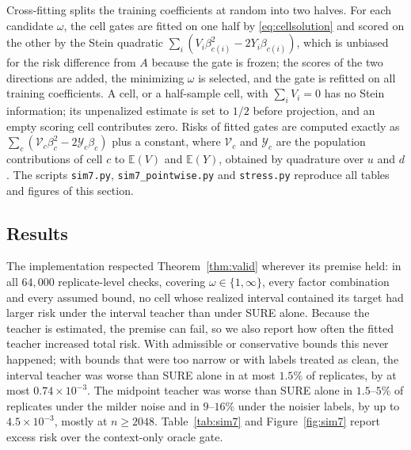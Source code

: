 \documentclass[11pt]{article}
\theoremstyle{plain}
\theoremstyle{definition}
\theoremstyle{remark}
\newcommand{\E}{\mathbb E}
\begin{document}
Cross-fitting splits the training coefficients at random into two halves. For each candidate
$\omega$, the cell gates are fitted on one half by \eqref{eq:cellsolution} and scored on the
other by the Stein quadratic $\sum_i(V_i\beta_{c(i)}^2-2Y_i\beta_{c(i)})$, which is unbiased
for the risk difference from $A$ because the gate is frozen; the scores of the two directions are
added, the minimizing $\omega$ is selected, and the gate is refitted on all training
coefficients. A cell, or a half-sample cell, with $\sum_iV_i=0$ has no Stein information; its
unpenalized estimate is set to $1/2$ before projection, and an empty scoring cell contributes
zero. Risks of fitted gates are computed exactly as $\sum_c(\mathcal V_c\beta_c^2-2\mathcal
Y_c\beta_c)$ plus a constant, where $\mathcal V_c$ and $\mathcal Y_c$ are the population
contributions of cell $c$ to $\E(V)$ and $\E(Y)$, obtained by quadrature over $u$ and $d$. The
scripts \texttt{sim7.py}, \texttt{sim7\_pointwise.py} and \texttt{stress.py} reproduce all tables
and figures of this section.

\subsection{Results}

The implementation respected Theorem~\ref{thm:valid} wherever its premise held: in all
$64{,}000$ replicate-level checks, covering $\omega\in\{1,\infty\}$, every factor combination and
every assumed bound, no cell whose realized interval contained its target had larger risk under
the interval teacher than under SURE alone. Because the teacher is estimated, the premise can
fail, so we also report how often the fitted teacher increased total risk. With admissible or
conservative bounds this never happened; with bounds that were too narrow or with labels treated
as clean, the interval teacher was worse than SURE alone in at most $1.5\%$ of replicates, by at
most $0.74\times10^{-3}$. The midpoint teacher was worse than SURE alone in $1.5$--$5\%$ of
replicates under the milder noise and in $9$--$16\%$ under the noisier labels, by up to
$4.5\times10^{-3}$, mostly at $n\ge2048$. Table~\ref{tab:sim7} and Figure~\ref{fig:sim7}
report excess risk over the context-only oracle gate.
\end{document}
